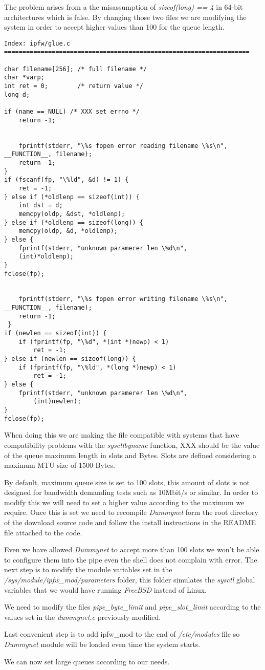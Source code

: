 The problem arises from a the misassumption of {\it sizeof(long) == 4} in 64-bit architectures which is false. By changing those two files we are modifying the system in order to accept higher values than 100 for the queue length.

\begin{lstlisting}
Index: ipfw/glue.c
===================================================================

char filename[256];	/* full filename */
char *varp;
int ret = 0;		/* return value */
long d;
 
if (name == NULL) /* XXX set errno */
	return -1;


	fprintf(stderr, "\%s fopen error reading filename \%s\n", __FUNCTION__, filename);
	return -1;
}
if (fscanf(fp, "\%ld", &d) != 1) {
	ret = -1;
} else if (*oldlenp == sizeof(int)) {
	int dst = d;
	memcpy(oldp, &dst, *oldlenp);
} else if (*oldlenp == sizeof(long)) {
	memcpy(oldp, &d, *oldlenp);
} else {
	fprintf(stderr, "unknown paramerer len \%d\n",
	(int)*oldlenp);
}
fclose(fp);


	fprintf(stderr, "\%s fopen error writing filename \%s\n", __FUNCTION__, filename);
 	return -1;
 }
if (newlen == sizeof(int)) {
	if (fprintf(fp, "\%d", *(int *)newp) < 1)
		ret = -1;
} else if (newlen == sizeof(long)) {
	if (fprintf(fp, "\%ld", *(long *)newp) < 1)
		ret = -1;
} else {
	fprintf(stderr, "unknown paramerer len \%d\n",
		(int)newlen);
}
fclose(fp);

\end{lstlisting}

When doing this we are making the file compatible with systems that have compatibility problems with the {\it sysctlbyname} function, XXX should be the value of the queue maximum length in slots and Bytes. Slots are defined considering a maximum MTU size of 1500 Bytes.

By default, maximum queue size is set to 100 slots, this amount of slots is not designed for bandwidth demanding tests such as 10Mbit/s or similar. In order to modify this we will need to set a higher value according to the maximum we require. Once this is set we need to recompile {\it Dummynet} form the root directory of the download source code and follow the install instructions in the README file attached to the code.

Even we have allowed {\it Dummynet} to accept more than 100 slots we won't be able to configure them into the pipe even the shell does not complain with error. The next step is to modify the module variables set in the {\it /sys/module/ipfw\_mod/parameters} folder, this folder simulates the {\it sysctl} global variables that we would have running {\it FreeBSD} instead of Linux. 

We need to modify the files {\it pipe\_byte\_limit} and {\it pipe\_slot\_limit} according to the values set in the {\it dummynet.c} previously modified.

Last convenient step is to add ipfw\_mod to the end of {\it /etc/modules} file so {\it Dummynet} module will be loaded even time the system starts. 

We can now set large queues according to our needs.